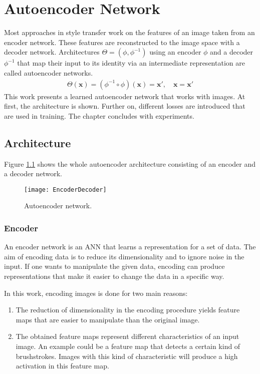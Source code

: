 \chapter{Autoencoder Network}
\label{ch:autoencoder_network}
Most approaches in style transfer work on the features of an image taken from an encoder network. These features are reconstructed to the image space with a decoder network. Architectures $\Theta = (\phi, \phi^{-1})$ using an encoder $\phi$ and a decoder $\phi^{-1}$ that map their input to its identity via an intermediate representation are called autoencoder networks. 
\begin{align}
\Theta(\mathbf{x})= (\phi^{-1} \circ \phi)(\mathbf{x}) = \mathbf{x}', \quad \mathbf{x} = \mathbf{x}'
\end{align}
This work presents a learned autoencoder network that works with images. At first, the architecture is shown. Further on, different losses are introduced that are used in training. The chapter concludes with experiments.

\section{Architecture}
Figure \ref{fig:autoencoder_network_schematic} shows the whole autoencoder architecture consisting of an encoder and a decoder network.
\begin{figure}[!ht]
	\centering
  	\texttt{[image: EncoderDecoder]}
	\caption{Autoencoder network.}
	\label{fig:autoencoder_network_schematic}
\end{figure}

\subsection{Encoder}
\label{sec:encoder}
An encoder network is an ANN that learns a representation for a set of data. The aim of encoding data is to reduce its dimensionality and to ignore noise in the input. If one wants to manipulate the given data, encoding can produce representations that make it easier to change the data in a specific way.

In this work, encoding images is done for two main reasons:
\begin{enumerate}
\item
The reduction of dimensionality in the encoding procedure yields feature maps that are easier to manipulate than the original image.

\item
The obtained feature maps represent different characteristics of an input image. An example could be a feature map that detects a certain kind of brushstrokes. Images with this kind of characteristic will produce a high activation in this feature map.
\end{enumerate}

